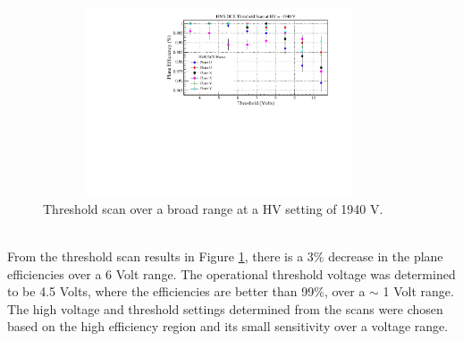 \documentclass[letterpaper, 10 pt, conference]{ieeeconf}  %
\begin{document}
\begin{figure}[h!]
  \centering
  \includegraphics[width=4.1in, height=2.2in]{dc2_tests/dc2_thrsscan_HV_1940V.pdf}
  \caption{Threshold scan over a broad range at a HV setting of 1940 V.}
  \label{fig:hdc2_thrsscan}
\end{figure} \\
From the threshold scan results in Figure \ref{fig:hdc2_thrsscan}, there is a 3$\%$ decrease in the plane efficiencies over a
6 Volt range. The operational threshold voltage was determined to be 4.5 Volts, where the efficiencies are better than 99$\%$, over a $\sim$ 1 Volt range.
The high voltage and threshold settings determined from the scans were chosen based on the high efficiency region and its small sensitivity over a voltage range.  
\end{document}
